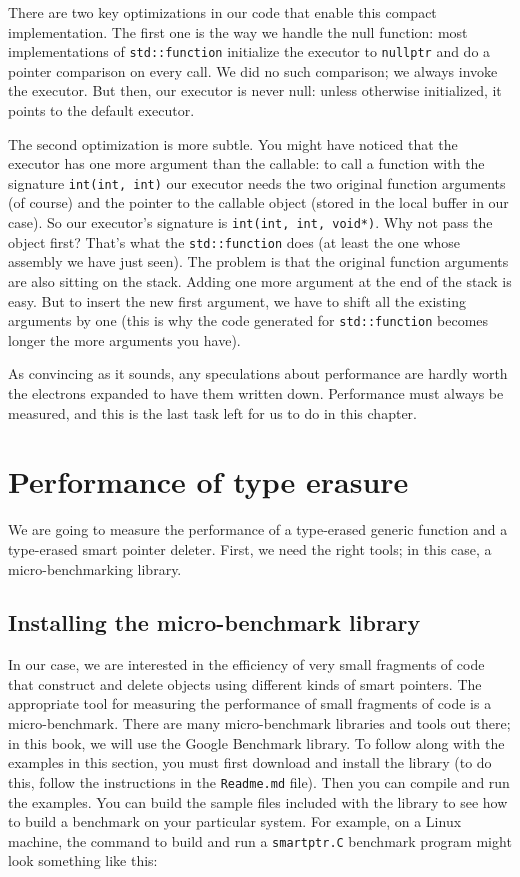 {There are two key optimizations in our code that enable this compact implementation. The first one is the way we handle the null function: most implementations of \texttt{std::function} initialize the executor to \texttt{nullptr} and do a pointer comparison on every call. We did no such comparison; we always invoke the executor. But then, our executor is never null: unless otherwise initialized, it points to the default executor.

The second optimization is more subtle. You might have noticed that the executor has one more argument than the callable: to call a function with the signature \texttt{int(int,\ int)} our executor needs the two original function arguments (of course) and the pointer to the callable object (stored in the local buffer in our case). So our executor's signature is \texttt{int(int,\ int,\ void*)}. Why not pass the object first? That's what the \texttt{std::function} does (at least the one whose assembly we have just seen). The problem is that the original function arguments are also sitting on the stack. Adding one more argument at the end of the stack is easy. But to insert the new first argument, we have to shift all the existing arguments by one (this is why the code generated for \texttt{std::function} becomes longer the more arguments you have).

As convincing as it sounds, any speculations about performance are hardly worth the electrons expanded to have them written down. Performance must always be measured, and this is the last task left for us to do in this chapter.

\section{Performance of type erasure}

We are going to measure the performance of a type-erased generic function and a type-erased smart pointer deleter. First, we need the right tools; in this case, a micro-benchmarking library.

\subsection{Installing the micro-benchmark library}

In our case, we are interested in the efficiency of very small fragments of code that construct and delete objects using different kinds of smart pointers. The appropriate tool for measuring the performance of small fragments of code is a micro-benchmark. There are many micro-benchmark libraries and tools out there; in this book, we will use the Google Benchmark library. To follow along with the examples in this section, you must first download and install the library (to do this, follow the instructions in the \texttt{Readme.md} file). Then you can compile and run the examples. You can build the sample files included with the library to see how to build a benchmark on your particular system. For example, on a Linux machine, the command to build and run a \texttt{smartptr.C} benchmark program might look something like this:

}
